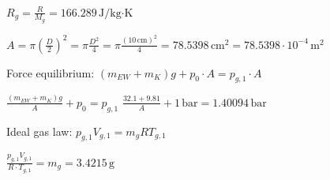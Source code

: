 \( R_g = \frac{R}{M_g} = 166.289 \, \text{J/kg·K} \)  

\( A = \pi \left(\frac{D}{2}\right)^2 = \pi \frac{D^2}{4} = \pi \frac{(10 \, \text{cm})^2}{4} = 78.5398 \, \text{cm}^2 = 78.5398 \cdot 10^{-4} \, \text{m}^2 \)  

Force equilibrium:  
\( (m_{EW} + m_K) g + p_0 \cdot A = p_{g,1} \cdot A \)  

\( \frac{(m_{EW} + m_K) g}{A} + p_0 = p_{g,1} \)  
\( \frac{32.1 + 9.81}{A} + 1 \, \text{bar} = 1.40094 \, \text{bar} \)  

Ideal gas law:  
\( p_{g,1} V_{g,1} = m_g R T_{g,1} \)  

\( \frac{p_{g,1} V_{g,1}}{R \cdot T_{g,1}} = m_g = 3.4215 \, \text{g} \)